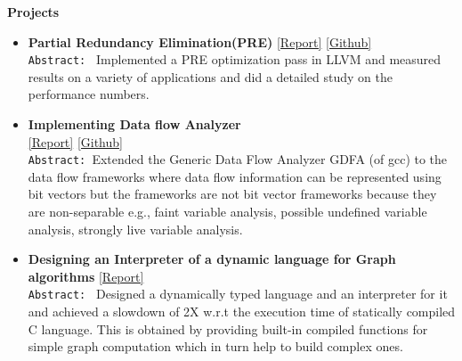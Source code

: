 \documentclass[9pt]{article}
\newenvironment{changemargin}[2]{%
  \begin{list}{}{%
    \setlength{\topsep}{0pt}%
    \setlength{\leftmargin}{#1}%
    \setlength{\rightmargin}{#2}%
    \setlength{\listparindent}{\parindent}%
    \setlength{\itemindent}{\parindent}%
    \setlength{\parsep}{\parskip}%
  }%
  \item[]}{\end{list}
}
\newenvironment{body} {
	\vspace*{-16pt}
	\begin{changemargin}{-0.25in}{-0.5in}
  }	
	{\end{changemargin}
}
\begin{document}
\begin{body}
	\vspace{14pt}
	\textbf{Projects}{} \hfill  \\
	\begin{itemize} \itemsep -0pt
           \item \textbf{Partial Redundancy Elimination(PRE)} 
           \href{http://web.engr.illinois.edu/~sdasgup3/Document/report_cs526.pdf}{[Report]} 
           \href{https://github.com/sdasgup3/PartialRedundancyElimination}{[Github]} \\
                                  \texttt{Abstract: } Implemented a PRE
                                  optimization pass in LLVM and measured results
                                  on a variety of applications and did a detailed 
                                  study on the performance numbers. 

            \item \textbf{Implementing Data flow Analyzer} \\
           \href{http://web.engr.illinois.edu/~sdasgup3/Document/report_gdfa.pdf}{[Report]} 
           \href{https://github.com/sdasgup3/NonSeparableGlobalDataFlowFramework}{[Github]} \\
                                \texttt{Abstract: }Extended the Generic Data Flow Analyzer
                                GDFA (of gcc) to the data flow frameworks where
                                data flow information can be represented using
                                bit vectors but the frameworks are not bit
                                vector frameworks because they are
                                non-separable e.g., faint variable analysis,
                                possible undefined variable analysis, strongly
                                live variable analysis.	

           \item \textbf{Designing an Interpreter of a dynamic language for Graph
algorithms}
           \href{http://web.engr.illinois.edu/~sdasgup3/Document/report_cs598dhp.pdf}{[Report]} \\
                                  \texttt{Abstract: } 
                                  Designed a dynamically typed language and an interpreter for it and 
                                  achieved a slowdown of 2X w.r.t the execution time of statically compiled C
                                  language. This is obtained by providing built-in compiled functions 
                                  for simple graph computation which in turn help to build complex
                                  ones.


\end{itemize}
\end{body}
\end{document}
